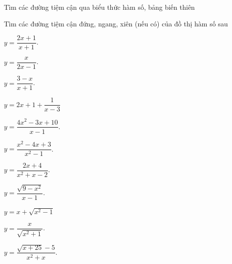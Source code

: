 \begin{dang}{Tìm các đường tiệm cận qua biểu thức hàm số, bảng biến thiên}
\end{dang}
\begin{vd} Tìm các đường tiệm cận đứng, ngang, xiên (nếu có) của đồ thị hàm số sau
    \begin{listEX}[3]
        \item $y=\dfrac{2x+1}{x+1}$.
        \item $y=\dfrac{x}{2x-1}$.
        \item $y=\dfrac{3-x}{x+1}$.
        \item $y=2x+1+\dfrac{1}{x-3}$
        \item $y=\dfrac{4x^2-3x+10}{x-1}$.
        \item $y=\dfrac{x^2-4x+3}{x^2-1}$.
        \item $y=\dfrac{2x+4}{x^2+x-2}$.
        \item $y=\dfrac{\sqrt{9-x^2}}{x-1}$.
        \item $y=x+\sqrt{x^2-1}$
        	\item $y=\dfrac{x}{\sqrt{x^2+1}}$.
        	\item $y=\dfrac{\sqrt{x+25}-5}{x^2+x}$.
    \end{listEX}
    \loigiai{}
\end{vd}
